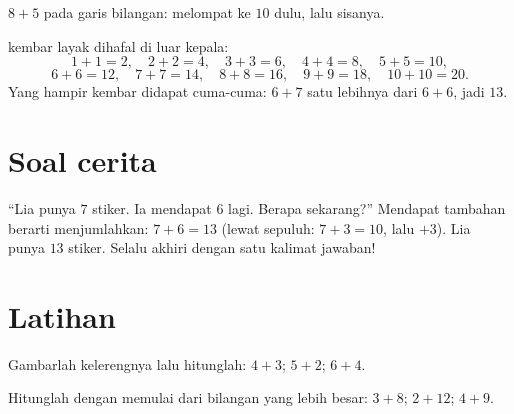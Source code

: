 \begin{omfigure}

{\small $8 + 5$ pada garis bilangan: melompat ke $10$ dulu, lalu sisanya.}
\end{omfigure}

\begin{example}\label{ex:g1:addition:doubles}
 kembar layak dihafal di luar kepala:
\[
1+1=2, \quad 2+2=4, \quad 3+3=6, \quad 4+4=8, \quad 5+5=10,
\]
\[
6+6=12, \quad 7+7=14, \quad 8+8=16, \quad 9+9=18, \quad 10+10=20 .
\]
Yang hampir kembar didapat cuma-cuma: $6 + 7$ satu lebihnya dari $6 + 6$, jadi $13$.
\end{example}

\section{Soal cerita}

\begin{example}\label{ex:g1:addition:problem}
``Lia punya $7$ stiker. Ia mendapat $6$ lagi. Berapa sekarang?''
Mendapat tambahan berarti menjumlahkan: $7 + 6 = 13$ (lewat sepuluh:
$7 + 3 = 10$, lalu $+3$). Lia punya $13$ stiker. Selalu akhiri dengan
satu kalimat jawaban!
\end{example}

\section{Latihan}

\begin{exercise}[$\star$]\label{exo:g1:addition:1}
Gambarlah kelerengnya lalu hitunglah: $4 + 3$; \quad $5 + 2$; \quad
$6 + 4$.
\end{exercise}

\begin{exercise}[$\star$]\label{exo:g1:addition:2}
Hitunglah dengan memulai dari bilangan yang lebih besar: $3 + 8$;
\quad $2 + 12$; \quad $4 + 9$.
\end{exercise}

